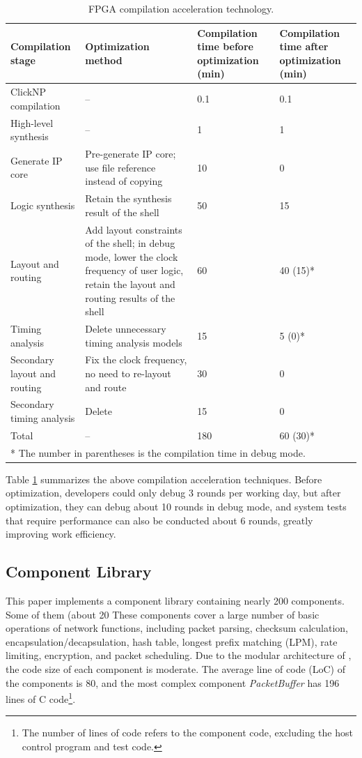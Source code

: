 \begin{table}[htbp]
	\centering
	\caption{FPGA compilation acceleration technology.}
	\label{clicknp:tab:fpga-compilation}
	\small
	\begin{tabular}{l|p{}|p{}|p{}}
		\toprule
		Compilation stage & Optimization method & Compilation time before optimization (min) & Compilation time after optimization (min) \\
		\midrule
		ClickNP compilation & -- & 0.1 & 0.1 \\
		High-level synthesis & -- & 1 & 1 \\
		Generate IP core & Pre-generate IP core; use file reference instead of copying & 10 & 0 \\
		Logic synthesis & Retain the synthesis result of the shell & 50 & 15 \\
		Layout and routing & Add layout constraints of the shell; in debug mode, lower the clock frequency of user logic, retain the layout and routing results of the shell & 60 & 40 (15)* \\
		Timing analysis & Delete unnecessary timing analysis models & 15 & 5 (0)* \\
		Secondary layout and routing & Fix the clock frequency, no need to re-layout and route & 30 & 0 \\
		Secondary timing analysis & Delete & 15 & 0 \\
		\midrule
		Total & -- & 180 & 60 (30)* \\
		\bottomrule
		\multicolumn{4}{l}{* The number in parentheses is the compilation time in debug mode.}
	\end{tabular}
\end{table}

Table \ref{clicknp:tab:fpga-compilation} summarizes the above compilation acceleration techniques. Before optimization, developers could only debug 3 rounds per working day, but after optimization, they can debug about 10 rounds in debug mode, and system tests that require performance can also be conducted about 6 rounds, greatly improving work efficiency.


\subsection{\name Component Library}
\label{clicknp:subsec:lib}

This paper implements a \name{} component library containing nearly 200 components.
Some of them (about 20%
These components cover a large number of basic operations of network functions, including packet parsing, checksum calculation, encapsulation/decapsulation, hash table, longest prefix matching (LPM), rate limiting, encryption, and packet scheduling.
Due to the modular architecture of \name, the code size of each component is moderate.
The average line of code (LoC) of the components is 80, and the most complex component \textit {PacketBuffer} has 196 lines of C code\footnote{The number of lines of code refers to the \name component code, excluding the host control program and test code.}.

